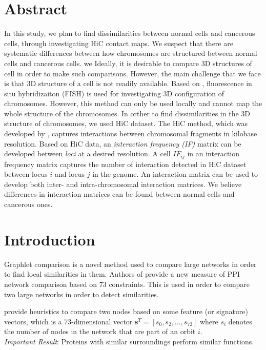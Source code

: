 \documentclass[a4,center,fleqn]{NAR}
\begin{document}
\section{Abstract}

In this study, we plan to find dissimilarities between normal cells and cancerous cells,
through investigating HiC contact maps. 
We suspect that there are systematic differences between how chromosomes are structured
between normal cells and cancerous cells.
we 
Ideally, it is desirable to compare 3D structures of 
cell in order to make such comparisons.
However, the main challenge that we face is that 
3D structure of a cell is not readily available. Based on
\cite{adhikari2016chromosome3d}, fluorescence in situ hybridizaiton
(FISH) is used for investigating 3D configuration of chromosomes.
However, this method can only be used locally and cannot map
the whole structure of the chromosomes.
In orther to find dissimilarities in the 3D structure of 
chromosomes, we used HiC dataset.
The HiC method, which was developed by \cite{lieberman2009comprehensive}, captures interactions between 
chromosomal fragments in kilobase resolution. Based on HiC data, an
\textit{interaction frequency (IF) } matrix can be developed between \textit{loci} at a desired resolution.
A cell $IF_{ij}$ in an interaction frequency matrix captures the number of interaction detected
in HiC dataset between locus $i$ and locus $j$ in the genome.
An interaction matrix can be used to develop both inter- and intra-chromosomal interaction matrices.
We believe differences in interaction matrices can be found between normal cells and cancerous ones.

\section{Introduction}

Graphlet comparison is a novel method used to compare large networks in order to
find local similarities in them.
Authors of \cite{prvzulj2007biological} provide a new measure of PPI
network comparison
based on 73 constraints. This is used in order to compare two large
networks in order to detect similarities.

\cite{milenkoviae2008uncovering} 
 provide heuristics to compare two nodes based on some feature
(or signature) vectors, which is a 73-dimensional vector
$\mathbf{s}^T
= [s_0, s_2, ..., s_{72}]$ where $s_i$ denotes the number of nodes in
the network that are part of an orbit $i$. \\
\textit{Important Result}: Proteins with similar surroundings perform
similar functions.
\end{document}
